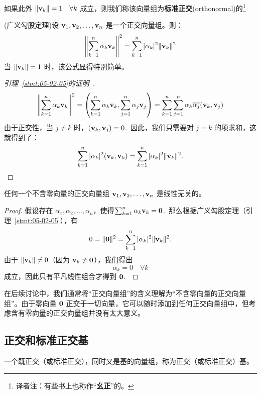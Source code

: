 如果此外 $\|\mathbf{v}_k\| = 1 \quad \forall k$ 成立，则我们称该向量组为\textbf{标准正交}(orthonormal)的\footnote{译者注：有些书上也称作“\textbf{幺正}”的。}

\begin{lemma}\label{stmt:05-02-05} (广义勾股定理)设 $\mathbf{v}_1, \mathbf{v}_2, \dots, \mathbf{v}_n$ 是一个正交向量组。则：
$$\left\| \sum_{k=1}^n \alpha_k \mathbf{v}_k \right\|^2 = \sum_{k=1}^n |\alpha_k|^2 \|\mathbf{v}_k\|^2$$
当 $\|\mathbf{v}_k\| = 1$ 时，该公式显得特别简单。\end{lemma}

\begin{proof}[\normalfont\heiti 引理~\ref{stmt:05-02-05}的证明~\nopunct]
$$\left\| \sum_{k=1}^n \alpha_k \mathbf{v}_k \right\|^2 = \left( \sum_{k=1}^n \alpha_k \mathbf{v}_k, \sum_{j=1}^n \alpha_j \mathbf{v}_j \right) = \sum_{k=1}^n \sum_{j=1}^n \alpha_k \overline{\alpha_j} (\mathbf{v}_k, \mathbf{v}_j)$$
由于正交性，当 $j \ne k$ 时，$(\mathbf{v}_k, \mathbf{v}_j) = 0$.~因此，我们只需要对 $j=k$ 的项求和，这就得到了：
$$\sum_{k=1}^n |\alpha_k|^2 (\mathbf{v}_k, \mathbf{v}_k) = \sum_{k=1}^n |\alpha_k|^2 \|\mathbf{v}_k\|^2.$$\end{proof}

\begin{corollary}\label{stmt:05-02-06}
任何一个不含零向量的正交向量组 $\mathbf{v}_1, \mathbf{v}_2, \dots, \mathbf{v}_n$ 是线性无关的。
\end{corollary}

\begin{proof}假设存在 $\alpha_1, \alpha_2, \dots, \alpha_n$，使得$\sum_{k=1}^n \alpha_k \mathbf{v}_k = \mathbf{0}$.~那么根据广义勾股定理（引理~\ref{stmt:05-02-05}），有
$$0 = \|\mathbf{0}\|^2 = \sum_{k=1}^n |\alpha_k|^2 \|\mathbf{v}_k\|^2.$$
由于 $\|\mathbf{v}_k\| \ne 0$（因为 $\mathbf{v}_k \ne \mathbf{0}$），我们得出
$$\alpha_k = 0 \quad \forall k$$
 成立，因此只有平凡线性组合才得到 $\mathbf{0}$.~\end{proof}

\begin{remark*}
在后续讨论中，我们通常将“正交向量组”的含义理解为“不含零向量的正交向量组”。由于零向量 $\mathbf{0}$ 正交于一切向量，它可以随时添加到任何正交向量组中，但考虑含有零向量的正交向量组并没有太大意义。
\end{remark*}

\subsection{正交和标准正交基}\label{sec:05-02-01}

\begin{definition}\label{stmt:05-02-07}
一个既正交（或标准正交），同时又是基的向量组，称为正交（或标准正交）基。
\end{definition}

